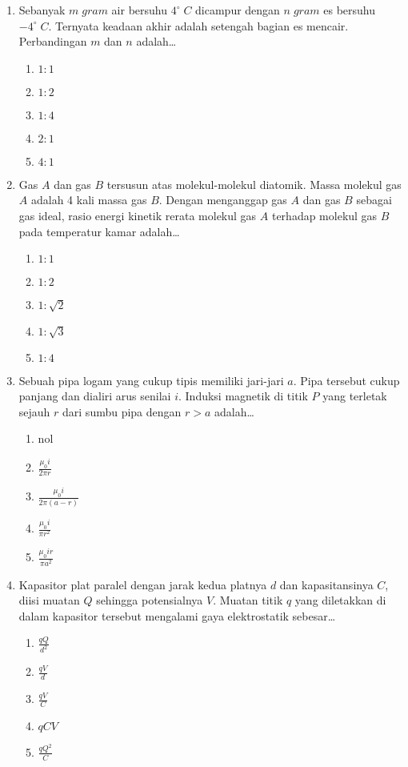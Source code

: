 \documentclass[A4,12PT, english, twocolumn]{journal}
\begin{document}
\begin{enumerate}
\item Sebanyak $m \; gram$ air bersuhu $4^\circ \; C$ dicampur dengan $n \; gram$ es bersuhu $-4^\circ \; C$. Ternyata keadaan akhir adalah setengah bagian es mencair. Perbandingan $m$ dan $n$ adalah\dots
    \begin{enumerate}
        \item $1:1$
        \item $1:2$
        \item $1:4$
        \item $2:1$
        \item $4:1$
    \end{enumerate}

\item Gas $A$ dan gas $B$ tersusun atas molekul-molekul diatomik. Massa molekul gas $A$ adalah 4 kali massa gas $B$. Dengan menganggap gas $A$ dan gas $B$ sebagai gas ideal, rasio energi kinetik rerata molekul gas $A$ terhadap molekul gas $B$ pada temperatur kamar adalah\dots
    \begin{enumerate}
        \item $1:1$
        \item $1:2$
        \item $1:\sqrt{2}$
        \item $1:\sqrt{3}$
        \item $1:4$
    \end{enumerate}
    
\item Sebuah pipa logam yang cukup tipis memiliki jari-jari $a$. Pipa tersebut cukup panjang dan dialiri arus senilai $i$. Induksi magnetik di titik $P$ yang terletak sejauh $r$ dari sumbu pipa dengan $r>a$ adalah\dots
	\begin{enumerate}
		\item nol
		\item $\frac{\mu_0 i}{2 \pi r}$
		\item $\frac{\mu_0 i}{2 \pi (a-r)}$
		\item $\frac{\mu_0 i}{\pi r^2}$
		\item $\frac{\mu_0 i r}{\pi a^2}$
	\end{enumerate}

\item Kapasitor plat paralel dengan jarak kedua platnya $d$ dan kapasitansinya $C$, diisi muatan $Q$ sehingga potensialnya $V$. Muatan titik $q$ yang diletakkan di dalam kapasitor tersebut mengalami gaya elektrostatik sebesar\dots
   \begin{enumerate}
        \item $\frac{qQ}{d^2}$
        \item $\frac{qV}{d}$
        \item $\frac{qV}{C}$
        \item $qCV$
        \item $\frac{qQ^2}{C}$
   \end{enumerate}
   

\end{enumerate}
\end{document}

